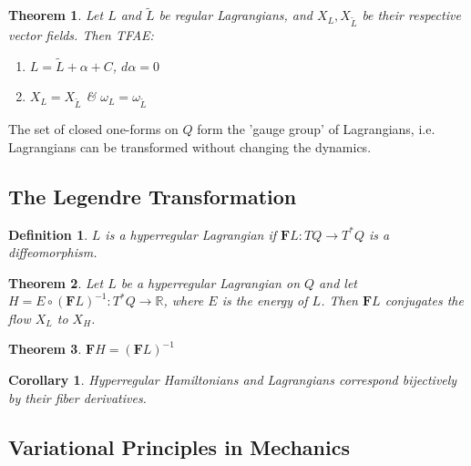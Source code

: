 \documentclass{article}
\newtheorem{thm}{Theorem}
\newtheorem{defn}{Definition}
\newtheorem{cor}{Corollary}
\begin{document}
\begin{thm}

Let $L$ and $\tilde{L}$ be regular Lagrangians, and $X_L, X_{\tilde{L}}$ be their respective vector fields. Then TFAE:

\begin{enumerate}
    \item $L = \tilde{L} + \alpha + C$, $d \alpha = 0$
    \item $ X_L = X_{\tilde{L}} $ \& $ \omega_L = \omega_{\tilde{L}} $
\end{enumerate}

\end{thm}

The set of closed one-forms on $Q$ form the 'gauge group' of Lagrangians, i.e. Lagrangians can be transformed without changing the dynamics.

\subsection{The Legendre Transformation}

\begin{defn}

$L$ is a hyperregular Lagrangian if $\textbf{F}L: TQ \to T^*Q$ is a diffeomorphism.

\end{defn}

\begin{thm}

Let $L$ be a hyperregular Lagrangian on $Q$ and let $H = E \circ (\textbf{F}L)^{-1}: T^*Q \to \mathbb{R}$, where $E$ is the energy of $L$. Then $\textbf{F}L$ conjugates the flow $X_L$ to $X_H$.

\end{thm}

\begin{thm}

$\textbf{F}H = (\textbf{F}L)^{-1}$

\end{thm}

\begin{cor}

Hyperregular Hamiltonians and Lagrangians correspond bijectively by their fiber derivatives.

\end{cor}

\subsection{Variational Principles in Mechanics}
\end{document}

